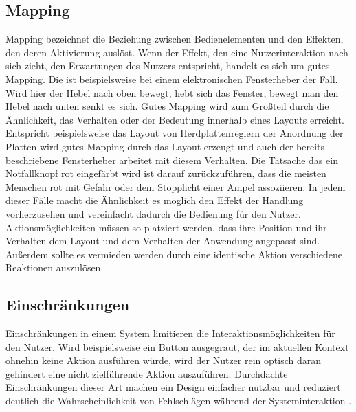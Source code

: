 \subsection*{Mapping}
Mapping bezeichnet die Beziehung zwischen Bedienelementen und den Effekten, den deren Aktivierung auslöst.
Wenn der Effekt, den eine Nutzerinteraktion nach sich zieht, den Erwartungen des Nutzers entspricht, handelt es sich um gutes Mapping.
Die ist beispielsweise bei einem elektronischen Fensterheber der Fall. Wird hier der Hebel nach oben bewegt, hebt sich das Fenster, bewegt man den Hebel nach unten senkt es sich.
Gutes Mapping wird zum Großteil durch die Ähnlichkeit, das Verhalten oder der Bedeutung innerhalb eines Layouts erreicht.
Entspricht beispielsweise das Layout von Herdplattenreglern der Anordnung der Platten wird gutes Mapping durch das Layout erzeugt und auch der bereits beschriebene Fensterheber arbeitet mit diesem Verhalten.
Die Tatsache das ein Notfallknopf rot eingefärbt wird ist darauf zurückzuführen, dass die meisten Menschen rot mit Gefahr oder dem Stopplicht einer Ampel assoziieren.
In jedem dieser Fälle macht die Ähnlichkeit es möglich den Effekt der Handlung vorherzusehen und vereinfacht dadurch die Bedienung für den Nutzer.
Aktionsmöglichkeiten müssen so platziert werden, dass ihre Position und ihr Verhalten dem Layout und dem Verhalten der Anwendung angepasst sind. 
Außerdem sollte es vermieden werden durch eine identische Aktion verschiedene Reaktionen auszulösen\cite{Lidwell.2010}.

\subsection*{Einschränkungen}
Einschränkungen in einem System limitieren die Interaktionsmöglichkeiten für den Nutzer.
Wird beispielsweise ein Button ausgegraut, der im aktuellen Kontext ohnehin keine Aktion ausführen würde, wird der Nutzer rein optisch daran gehindert eine nicht zielführende Aktion auszuführen.
Durchdachte Einschränkungen dieser Art machen ein Design einfacher nutzbar und reduziert deutlich die Wahrscheinlichkeit von Fehlschlägen während der Systeminteraktion \cite{Lidwell.2010}.


